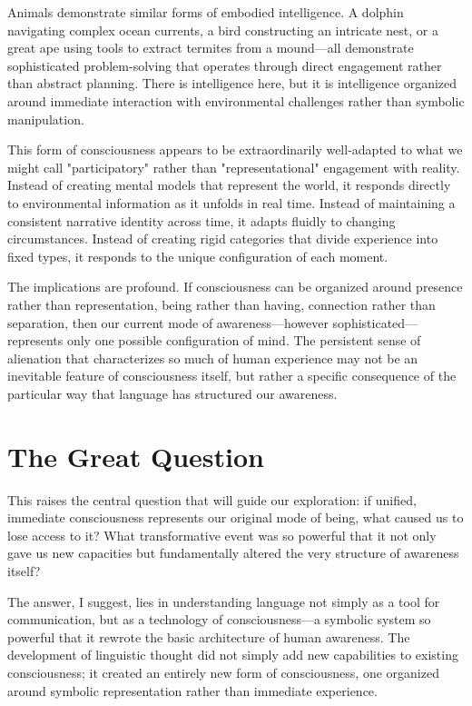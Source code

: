 Animals demonstrate similar forms of embodied intelligence. A dolphin navigating complex ocean currents, a bird constructing an intricate nest, or a great ape using tools to extract termites from a mound—all demonstrate sophisticated problem-solving that operates through direct engagement rather than abstract planning. There is intelligence here, but it is intelligence organized around immediate interaction with environmental challenges rather than symbolic manipulation.

This form of consciousness appears to be extraordinarily well-adapted to what we might call "participatory" rather than "representational" engagement with reality. Instead of creating mental models that represent the world, it responds directly to environmental information as it unfolds in real time. Instead of maintaining a consistent narrative identity across time, it adapts fluidly to changing circumstances. Instead of creating rigid categories that divide experience into fixed types, it responds to the unique configuration of each moment.

The implications are profound. If consciousness can be organized around presence rather than representation, being rather than having, connection rather than separation, then our current mode of awareness—however sophisticated—represents only one possible configuration of mind. The persistent sense of alienation that characterizes so much of human experience may not be an inevitable feature of consciousness itself, but rather a specific consequence of the particular way that language has structured our awareness.

\section{The Great Question}

This raises the central question that will guide our exploration: if unified, immediate consciousness represents our original mode of being, what caused us to lose access to it? What transformative event was so powerful that it not only gave us new capacities but fundamentally altered the very structure of awareness itself?

The answer, I suggest, lies in understanding language not simply as a tool for communication, but as a technology of consciousness—a symbolic system so powerful that it rewrote the basic architecture of human awareness. The development of linguistic thought did not simply add new capabilities to existing consciousness; it created an entirely new form of consciousness, one organized around symbolic representation rather than immediate experience.

